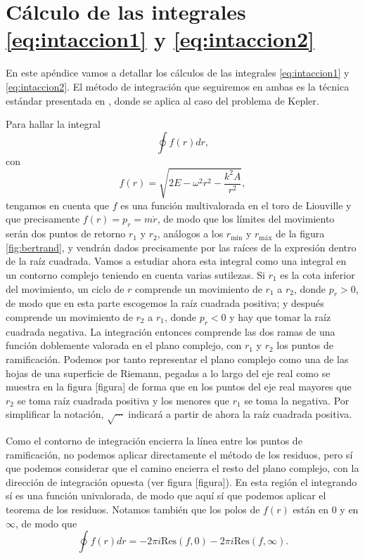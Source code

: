 \documentclass[12pt,a4paper,twoside]{article}
\theoremstyle{definition} \newtheorem{defn}[thm]{Definición}
\theoremstyle{definition} \newtheorem{ejemplo}[thm]{Ejemplo}
\theoremstyle{definition} \newtheorem{ejercicio}[thm]{Ejercicio}
\theoremstyle{remark} \newtheorem*{obs}{Observación}
\begin{document}
\appendix
\section{Cálculo de las integrales \eqref{eq:intaccion1} y \eqref{eq:intaccion2}}
En este apéndice vamos a detallar los cálculos de las integrales \eqref{eq:intaccion1} y \eqref{eq:intaccion2}. El método de integración que seguiremos en ambas es la técnica estándar presentada en \cite{goldstein}, donde se aplica al caso del problema de Kepler.

Para hallar la integral
\begin{equation*}
  \oint f(r)dr, 
\end{equation*}
con
\begin{equation}
f(r)=\sqrt{2E-\omega^2r^2-\frac{k^2A}{r^2}},
\end{equation}
tengamos en cuenta que $f$ es una función multivalorada en el toro de Liouville y que precisamente $f(r)=p_r=m\dot{r}$, de modo que los límites del movimiento serán dos puntos de retorno $r_1$ y $r_2$, análogos a los $r_{\text{min}}$ y $r_{\text{máx}}$ de la figura \ref{fig:bertrand}, y vendrán dados precisamente por las raíces de la expresión dentro de la raíz cuadrada. Vamos a estudiar ahora esta integral como una integral en un contorno complejo teniendo en cuenta varias sutilezas. Si $r_1$ es la cota inferior del movimiento, un ciclo de $r$ comprende un movimiento de $r_1$ a $r_2$, donde $p_r>0$, de modo que en esta parte escogemos la raíz cuadrada positiva; y después comprende un movimiento de $r_2$ a $r_1$, donde $p_r<0$ y hay que tomar la raíz cuadrada negativa. La integración entonces comprende las dos ramas de una función doblemente valorada en el plano complejo, con $r_1$ y $r_2$ los puntos de ramificación. Podemos por tanto representar el plano complejo como una de las hojas de una superficie de Riemann, pegadas a lo largo del eje real como se muestra en la figura [figura] de forma que en los puntos del eje real mayores que $r_2$ se toma raíz cuadrada positiva y los menores que $r_1$ se toma la negativa. Por simplificar la notación, $\sqrt{\cdots}$ indicará a partir de ahora la raíz cuadrada positiva. 

Como el contorno de integración encierra la línea entre los puntos de ramificación, no podemos aplicar directamente el método de los residuos, pero sí que podemos considerar que el camino encierra el resto del plano complejo, con la dirección de integración opuesta (ver figura [figura]). En esta región el integrando sí es una función univalorada, de modo que aquí sí que podemos aplicar el teorema de los residuos. Notamos también que los polos de $f(r)$ están en $0$ y en $\infty$, de modo que
\begin{equation}
  \oint f(r)dr =-2\pi i \mathrm{Res}(f,0) -2\pi i \mathrm{Res}(f,\infty).
\end{equation}
\end{document}
